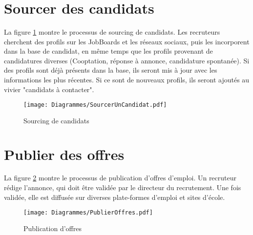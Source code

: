 \section{Sourcer des candidats}

\paragraph{} La figure \ref{sourcing} montre le processus de sourcing de candidats. Les recruteurs cherchent des profils sur les JobBoards et les réseaux sociaux, puis les incorporent dans la base de candidat, en même temps que les profils provenant de candidatures diverses (Cooptation, réponse à annonce, candidature spontanée). Si des profils sont déjà présents dans la base, ils seront mis à jour avec les informations les plus récentes. Si ce sont de nouveaux profils, ils seront ajoutés au vivier "candidats à contacter".

\begin{figure}
	\centering
	\begin{sideways}
	\texttt{[image: Diagrammes/SourcerUnCandidat.pdf]}
	\end{sideways}
	\caption{Sourcing de candidats}
	\label{sourcing}	
\end{figure}

\section{Publier des offres}

\paragraph{} La figure \ref{publierOffres} montre le processus de publication d'offres d'emploi. Un recruteur rédige l'annonce, qui doit être validée par le directeur du recrutement. Une fois validée, elle est diffusée sur diverses plate-formes d'emploi et sites d'école.


\begin{figure}
	\centering
	\texttt{[image: Diagrammes/PublierOffres.pdf]}
	\caption{Publication d'offres}
	\label{publierOffres}	
\end{figure}



